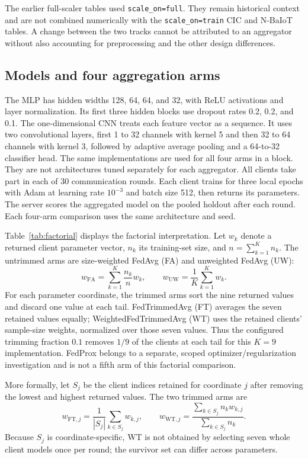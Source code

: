 \documentclass{ieeeaccess}
\begin{document}
The earlier full-scaler tables used \texttt{scale\_on=full}. They remain historical context and are not combined numerically with the \texttt{scale\_on=train} CIC and N-BaIoT tables. A change between the two tracks cannot be attributed to an aggregator without also accounting for preprocessing and the other design differences.

\subsection{Models and four aggregation arms}
The MLP has hidden widths 128, 64, 64, and 32, with ReLU activations and layer normalization. Its first three hidden blocks use dropout rates 0.2, 0.2, and 0.1. The one-dimensional CNN treats each feature vector as a sequence. It uses two convolutional layers, first 1 to 32 channels with kernel 5 and then 32 to 64 channels with kernel 3, followed by adaptive average pooling and a 64-to-32 classifier head. The same implementations are used for all four arms in a block. They are not architectures tuned separately for each aggregator. All clients take part in each of 30 communication rounds. Each client trains for three local epochs with Adam at learning rate $10^{-3}$ and batch size 512, then returns its parameters. The server scores the aggregated model on the pooled holdout after each round. Each four-arm comparison uses the same architecture and seed.

Table~\ref{tab:factorial} displays the factorial interpretation. Let $w_k$ denote a returned client parameter vector, $n_k$ its training-set size, and $n=\sum_{k=1}^{K}n_k$. The untrimmed arms are size-weighted FedAvg (FA) and unweighted FedAvg (UW):
\begin{equation}
w_{\mathrm{FA}}=\sum_{k=1}^{K}\frac{n_k}{n}w_k,\qquad
w_{\mathrm{UW}}=\frac{1}{K}\sum_{k=1}^{K}w_k.
\end{equation}
For each parameter coordinate, the trimmed arms sort the nine returned values and discard one value at each tail. FedTrimmedAvg (FT) averages the seven retained values equally; WeightedFedTrimmedAvg (WT) uses the retained clients' sample-size weights, normalized over those seven values. Thus the configured trimming fraction $0.1$ removes $1/9$ of the clients at each tail for this $K=9$ implementation. FedProx belongs to a separate, scoped optimizer/regularization investigation and is not a fifth arm of this factorial comparison.

More formally, let $S_j$ be the client indices retained for coordinate $j$ after removing the lowest and highest returned values. The two trimmed arms are
\begin{equation}
w_{\mathrm{FT},j}=\frac{1}{|S_j|}\sum_{k\in S_j}w_{k,j},\qquad
w_{\mathrm{WT},j}=\frac{\sum_{k\in S_j}n_k w_{k,j}}{\sum_{k\in S_j}n_k}.
\end{equation}
Because $S_j$ is coordinate-specific, WT is not obtained by selecting seven whole client models once per round; the survivor set can differ across parameters.
\end{document}
